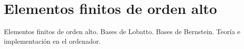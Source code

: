 \section{Elementos finitos de orden alto}

\begin{contenidos}
  Elementos finitos de orden alto. Bases de Lobatto. Bases de
  Bernstein. Teoría e implementación en el ordenador.
\end{contenidos}



